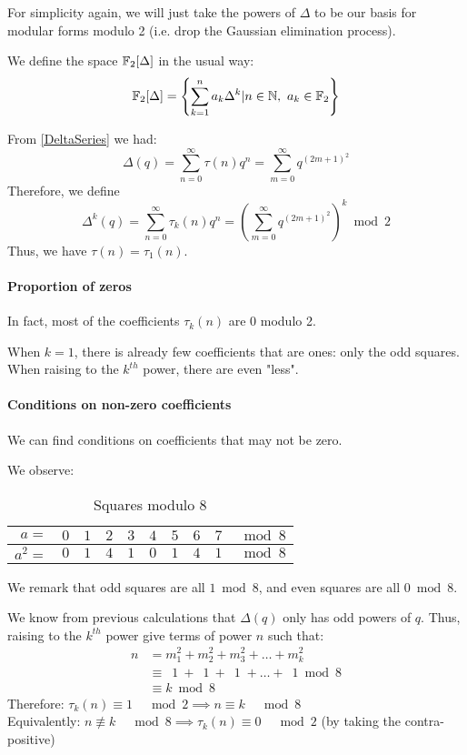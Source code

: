 For simplicity again, we will just take the powers of $\Delta$ to be our basis for modular forms modulo 2 (i.e. drop the Gaussian elimination process).

We define the space $\mathbb{F}_2[\Delta]$ in the usual way:
$$
\mathbb{F}_2[\Delta] = \left\lbrace \sum_{k=1}^{n}a_k \Delta^k | n \in \mathbb{N}, \  a_k \in \mathbb{F}_2 \right\rbrace
$$


From \ref{DeltaSeries} we had:
$$
\Delta(q) 
= \sum_{n=0}^{\infty} \tau(n)q^n
= \sum_{m=0}^{\infty} q^{(2m+1)^2}
$$
Therefore, we define 
$$
\Delta^{k}(q) 
= \sum_{n=0}^{\infty} \tau_k(n)q^n
= \left( \sum_{m=0}^{\infty} q^{(2m+1)^2} \right)^k \bmod 2
$$
Thus, we have $\tau(n)=\tau_1(n)$.

\paragraph{Proportion of zeros}
In fact, most of the coefficients $\tau_k(n)$ are $0$ modulo 2.

When $k=1$, there is already few coefficients that are ones: only the odd squares.
When raising to the $k^{th}$ power, there are even "less".

\paragraph{Conditions on non-zero coefficients}
We can find conditions on coefficients that may not be zero.

We observe:
\begin{table}[!ht]

	\begin{center}
		\begin{tabular}{|r||c|c|c|c|c|c|c|c||l|}
			\hline
			$a=$ & $0$ & $1$ & $2$ & $3$ & $4$ & $5$ & $6$ & $7$ & $\bmod 8$ \\
			\hline
			$a^2=$ & \color{BrickRed} $0$ & \color{ForestGreen} $1$ & \color{BrickRed} $4$ & \color{ForestGreen} $1$ & \color{BrickRed} $0$ & \color{ForestGreen} $1$ & \color{BrickRed} $4$ & \color{ForestGreen} $1$ & $\bmod 8$ \\
			\hline

		\end{tabular}
	\end{center}
	\caption{Squares modulo $8$}
	\label{table:SquaresMod8}
\end{table}
We remark that odd squares are all $1 \bmod 8$, and even squares are all $0 \bmod 8$.

We know from previous calculations that $\Delta(q)$ only has odd powers of $q$.
Thus, raising to the $k^{th}$ power give terms of power $n$ such that:
\begin{align*}
n &= m_1^2 + m_2^2 + m_3^2 + \dots + m_k^2 \\
&\equiv \:\; 1 \ + \:\; 1 \ + \:\; 1 \; + \dots + \:\; 1 \bmod 8 \\
&\equiv k \bmod 8
\end{align*}
Therefore: $\tau_k(n) \equiv 1 \quad \bmod 2 \implies n \equiv k \quad \bmod 8$\\
Equivalently: $n \not\equiv k \quad \bmod 8 \implies \tau_k(n) \equiv 0 \quad \bmod 2$ (by taking the contra-positive)

